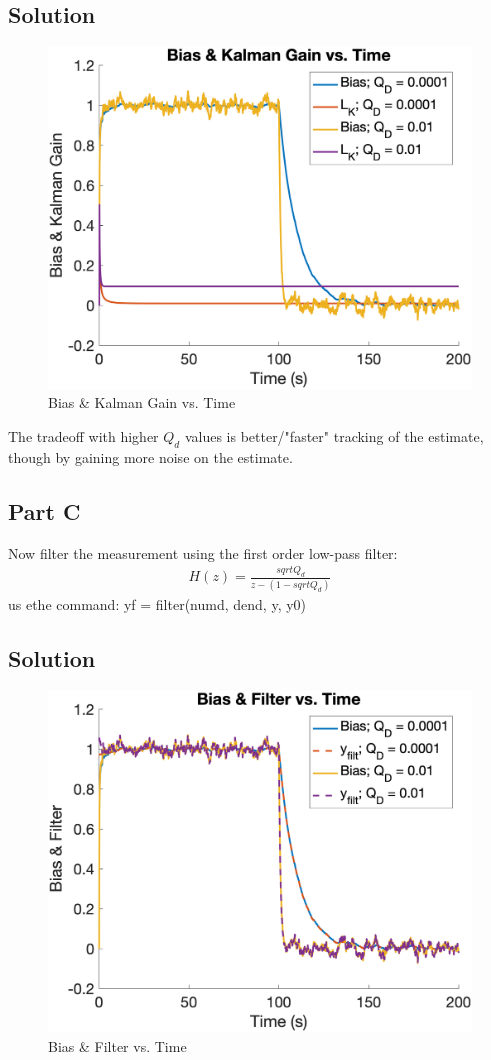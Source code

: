 \documentclass{article}
\begin{document}
\subsection*{Solution}
\begin{figure}[H]
    \centering
    \includegraphics[width=0.75\linewidth]{../figures/p2b.png}
    \caption{Bias \& Kalman Gain vs. Time}\label{fig:p2b}
\end{figure}
The tradeoff with higher $Q_d$ values is better/"faster" tracking of the estimate, though by gaining more noise on the estimate.

\subsection*{Part C}
Now filter the measurement using the first order low-pass filter:
\begin{gather}
    H(z)=\frac{sqrt{Q_d}}{z - (1-sqrt{Q_d})}
\end{gather}
us ethe command: yf = filter(numd, dend, y, y0)
\subsection*{Solution}
\begin{figure}[H]
    \centering
    \includegraphics[width=0.75\linewidth]{../figures/p2c.png}
    \caption{Bias \& Filter vs. Time}\label{fig:p2c}
\end{figure}
\end{document}
